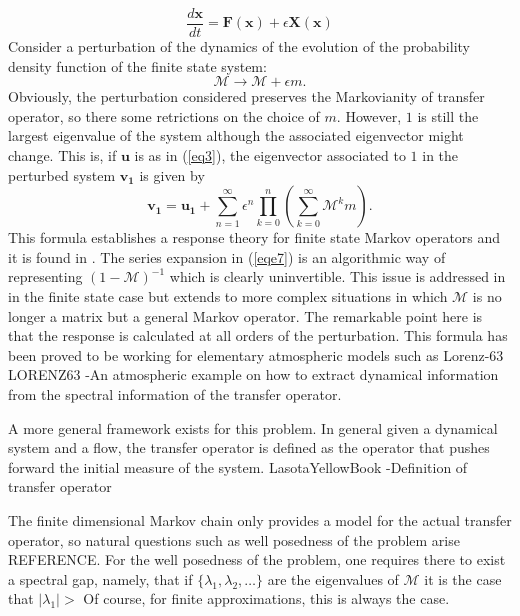 \begin{equation}
\frac{d\mathbf{x}}{dt}=\mathbf{F}(\mathbf{x}) + \epsilon \mathbf{X}(\mathbf{x})
\end{equation}
Consider a perturbation of the dynamics of the evolution of the probability density function of the finite state system:
\begin{equation}
	\mathcal{M} \longrightarrow \mathcal{M} + \epsilon m.
\end{equation}
Obviously, the perturbation considered preserves the Markovianity of transfer operator, so there some retrictions on the choice of $m$. However, $1$ is still the largest eigenvalue of the system although the associated eigenvector might change. This is, if $\mathbf{u}$ is as in (\ref{eq3}), the eigenvector associated to $1$ in the perturbed system $\mathbf{v_1}$ is given by
\begin{equation}\label{eqe7}
\mathbf{v_1}=\mathbf{u_1} + \sum_{n=1}^{\infty}\epsilon ^{n} \prod _{k=0}^{n}\left( \sum_{k=0}^{\infty}\mathcal{M}^km \right).
\end{equation}
This formula establishes a response theory for finite state Markov operators and it is found in \cite{lucarini}. The series expansion in (\ref{eqe7}) is an algorithmic way of representing $(1-\mathcal{M})^{-1}$ which is clearly uninvertible. This issue is addressed in \cite{lucarini} in the finite state case but extends to more complex situations in which $\mathcal{M}$ is no longer a matrix but a general Markov operator. The remarkable point here is that the response is calculated at all orders of the perturbation. This formula has been proved to be working for elementary atmospheric models such as Lorenz-63 LORENZ63
-An atmospheric example on how to extract dynamical information from the spectral information of the transfer operator.

A more general framework exists for this problem. In general given a dynamical system and a flow, the transfer operator is defined as the operator that pushes forward the initial measure of the system.
LasotaYellowBook
	-Definition of transfer operator

The finite dimensional Markov chain only provides a model for the actual transfer operator, so natural questions such as well posedness of the problem arise REFERENCE. For the well posedness of the problem, one requires there to exist a spectral gap, namely, that if $\{\lambda_1 , \lambda_2 , \ldots \}$ are the eigenvalues of $\mathcal{M}$ it is the case that $\vert \lambda _1 \vert >  $
Of course, for finite approximations, this is always the case.

